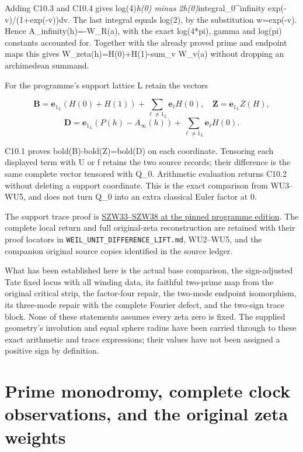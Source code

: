 \documentclass[
]{article}
\begin{document}
Adding C10.3 and C10.4 gives log(4)\emph{h(0) minus
2h(0)}integral\_0\^{}infinity exp(-v)/(1+exp(-v))dv. The last integral
equals log(2), by the substitution w=exp(-v). Hence
A\_infinity(h)=-W\_R(a), with the exact log(4*pi), gamma and log(pi)
constants accounted for. Together with the already proved prime and
endpoint maps this gives W\_zeta(h)=H(0)+H(1)-sum\_v W\_v(a) without
dropping an archimedean summand.

For the programme's support lattice L retain the vectors

\[
\boldsymbol B=\mathbf e_{1_L}(H(0)+H(1))
+\sum_{\ell\ne1_L}\mathbf e_\ell H(0),\quad
\boldsymbol Z=\mathbf e_{1_L}Z(H),
\] \[
\boldsymbol D=\mathbf e_{1_L}(P(h)-A_\infty(h))
+\sum_{\ell\ne1_L}\mathbf e_\ell H(0).
\tag{C10.2}
\]

C10.1 proves bold(B)-bold(Z)=bold(D) on each coordinate. Tensoring each
displayed term with U or f retains the two source records; their
difference is the same complete vector tensored with Q\_0. Arithmetic
evaluation returns C10.2 without deleting a support coordinate. This is
the exact comparison from WU3--WU5, and does not turn Q\_0 into an extra
classical Euler factor at 0.

The support trace proof is
\href{https://github.com/KokunoYumeto/zeta-function-research-reader/blob/76f421965914beb133df797835f940849844dc4f/workbenches/splitzero-tandem/branches/tau-zero-prime-positivity/SUPPORTED_ZERO_PRIME_WEIL_DERIVATION.md}{SZW33--SZW38
at the pinned programme edition}. The complete local return and full
original-zeta reconstruction are retained with their proof locators in
\nolinkurl{WEIL_UNIT_DIFFERENCE_LIFT.md}, WU2--WU5, and the companion original
source copies identified in the source ledger.

What has been established here is the actual base comparison, the
sign-adjusted Tate fixed locus with all winding data, its faithful
two-prime map from the original critical strip, the factor-four repair,
the two-mode endpoint isomorphism, its three-mode repair with the
complete Fourier defect, and the two-sign trace block. None of these
statements assumes every zeta zero is fixed. The supplied geometry's
involution and equal sphere radius have been carried through to these
exact arithmetic and trace expressions; their values have not been
assigned a positive sign by definition.

\section{Prime monodromy, complete clock observations, and the original
zeta
weights}\label{prime-monodromy-complete-clock-observations-and-the-original-zeta-weights}
\end{document}
